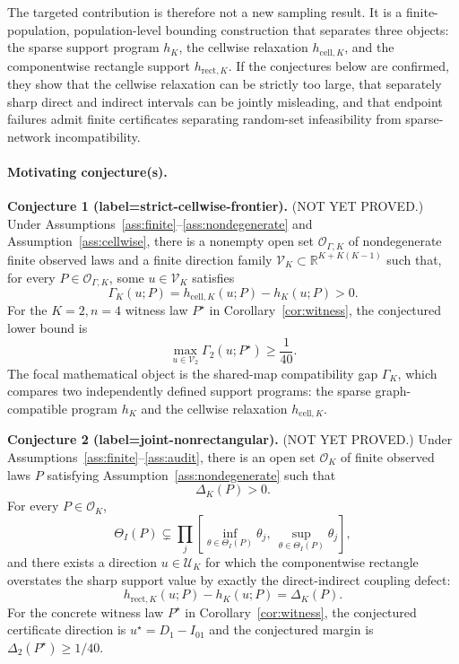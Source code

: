 \documentclass[11pt]{article}
\theoremstyle{definition}
\theoremstyle{plain}
\theoremstyle{remark}
\begin{document}
The targeted contribution is therefore not a new sampling result.  It is a finite-population, population-level bounding construction that separates three objects: the sparse support program \(h_K\), the cellwise relaxation \(h_{\mathrm{cell},K}\), and the componentwise rectangle support \(h_{\mathrm{rect},K}\).  If the conjectures below are confirmed, they show that the cellwise relaxation can be strictly too large, that separately sharp direct and indirect intervals can be jointly misleading, and that endpoint failures admit finite certificates separating random-set infeasibility from sparse-network incompatibility.

\paragraph{Motivating conjecture(s).}
\noindent\textbf{Conjecture 1 (label=strict-cellwise-frontier).}
(NOT YET PROVED.)  Under Assumptions~\ref{ass:finite}--\ref{ass:nondegenerate} and Assumption~\ref{ass:cellwise}, there is a nonempty open set \(\mathcal O_{\Gamma,K}\) of nondegenerate finite observed laws and a finite direction family \(\mathcal V_K\subset\mathbb R^{K+K(K-1)}\) such that, for every \(P\in\mathcal O_{\Gamma,K}\), some \(u\in\mathcal V_K\) satisfies
\[
\Gamma_K(u;P)=h_{\mathrm{cell},K}(u;P)-h_K(u;P)>0.
\]
For the \(K=2,n=4\) witness law \(P^\star\) in Corollary~\ref{cor:witness}, the conjectured lower bound is
\[
\max_{u\in\mathcal V_2}\Gamma_2(u;P^\star)\ge \frac{1}{40}.
\]
The focal mathematical object is the shared-map compatibility gap \(\Gamma_K\), which compares two independently defined support programs: the sparse graph-compatible program \(h_K\) and the cellwise relaxation \(h_{\mathrm{cell},K}\).

\noindent\textbf{Conjecture 2 (label=joint-nonrectangular).}
(NOT YET PROVED.)  Under Assumptions~\ref{ass:finite}--\ref{ass:audit}, there is an open set \(\mathcal O_K\) of finite observed laws \(P\) satisfying Assumption~\ref{ass:nondegenerate} such that
\[
\Delta_K(P)>0.
\]
For every \(P\in\mathcal O_K\),
\[
\Theta_I(P)\subsetneq
\prod_j [\inf_{\theta\in\Theta_I(P)}\theta_j,\ \sup_{\theta\in\Theta_I(P)}\theta_j],
\]
and there exists a direction \(u\in\mathcal U_K\) for which the componentwise rectangle overstates the sharp support value by exactly the direct-indirect coupling defect:
\[
h_{\mathrm{rect},K}(u;P)-h_K(u;P)=\Delta_K(P).
\]
For the concrete witness law \(P^\star\) in Corollary~\ref{cor:witness}, the conjectured certificate direction is \(u^\star=D_1-I_{01}\) and the conjectured margin is \(\Delta_2(P^\star)\ge1/40\).
\end{document}

